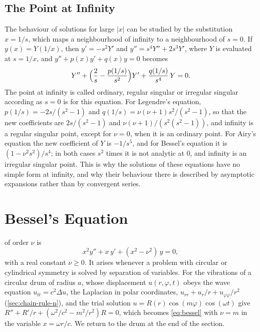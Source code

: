 \subsection{The Point at Infinity}

The behaviour of solutions for large $|x|$ can be studied by the substitution $x=1/s$, which maps a neighbourhood of infinity to a neighbourhood of $s=0$. If $y(x)=Y(1/x)$, then $y'=-s^2Y'$ and $y''=s^4Y''+2s^3Y'$, where $Y$ is evaluated at $s=1/x$, and $y''+p(x)y'+q(x)y=0$ becomes
\[
Y''+\Bigl(\frac2s-\frac{p(1/s)}{s^2}\Bigr)Y'+\frac{q(1/s)}{s^4}\,Y=0 .
\]
The point at infinity is called ordinary, regular singular or irregular singular according as $s=0$ is for this equation. For Legendre's equation, $p(1/s)=-2s/(s^2-1)$ and $q(1/s)=\nu(\nu+1)s^2/(s^2-1)$, so that the new coefficients are $2s/(s^2-1)$ and $\nu(\nu+1)/(s^2(s^2-1))$, and infinity is a regular singular point, except for $\nu=0$, when it is an ordinary point. For Airy's equation the new coefficient of $Y$ is $-1/s^5$, and for Bessel's equation it is $(1-\nu^2s^2)/s^4$; in both cases $s^2$ times it is not analytic at $0$, and infinity is an irregular singular point. This is why the solutions of these equations have no simple form at infinity, and why their behaviour there is described by asymptotic expansions rather than by convergent series.

\section{Bessel's Equation}
\label{sec:bessel}

 of order $\nu$ is
\begin{equation}
x^2y''+x\,y'+(x^2-\nu^2)\,y=0 ,
\label{eq:bessel}
\end{equation}
with a real constant $\nu\ge0$. It arises whenever a problem with circular or cylindrical symmetry is solved by separation of variables. For the vibrations of a circular drum of radius $a$, whose displacement $u(r,\varphi,t)$ obeys the wave equation $u_{tt}=c^2\Delta u$, the Laplacian in polar coordinates, $u_{rr}+u_r/r+u_{\varphi\varphi}/r^2$ (\cref{sec:chain-rule-n}), and the trial solution $u=R(r)\cos(m\varphi)\cos(\omega t)$ give $R''+R'/r+(\omega^2/c^2-m^2/r^2)R=0$, which becomes \eqref{eq:bessel} with $\nu=m$ in the variable $x=\omega r/c$. We return to the drum at the end of the section.

